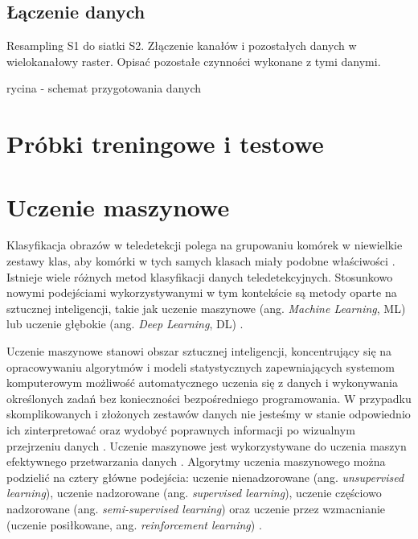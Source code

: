 \documentclass{amuthesis}
\begin{document}
\hypertarget{sec-processing-data-merging}{%
\subsection{Łączenie danych}\label{sec-processing-data-merging}}

Resampling S1 do siatki S2. Złączenie kanałów i pozostałych danych w
wielokanałowy raster. Opisać pozostałe czynności wykonane z tymi danymi.

rycina - schemat przygotowania danych

\hypertarget{sec-samples-methods}{%
\section{Próbki treningowe i testowe}\label{sec-samples-methods}}

\hypertarget{sec-machine-learning}{%
\section{Uczenie maszynowe}\label{sec-machine-learning}}

Klasyfikacja obrazów w teledetekcji polega na grupowaniu komórek w
niewielkie zestawy klas, aby komórki w tych samych klasach miały podobne
właściwości \autocite{ismail_2009_classification}. Istnieje wiele
różnych metod klasyfikacji danych teledetekcyjnych. Stosunkowo nowymi
podejściami wykorzystywanymi w tym kontekście są metody oparte na
sztucznej inteligencji, takie jak uczenie maszynowe (ang. \emph{Machine
Learning}, ML) lub uczenie głębokie (ang. \emph{Deep Learning}, DL)
\autocite{hejmanowska_2020_dane}.

Uczenie maszynowe stanowi obszar sztucznej inteligencji, koncentrujący
się na opracowywaniu algorytmów i modeli statystycznych zapewniających
systemom komputerowym możliwość automatycznego uczenia się z danych i
wykonywania określonych zadań bez konieczności bezpośredniego
programowania. W przypadku skomplikowanych i złożonych zestawów danych
nie jesteśmy w stanie odpowiednio ich zinterpretować oraz wydobyć
poprawnych informacji po wizualnym przejrzeniu danych
\autocite{mahesh_2019_ml}. Uczenie maszynowe jest wykorzystywane do
uczenia maszyn efektywnego przetwarzania danych
\autocite{sindayigaya_2022_ml}. Algorytmy uczenia maszynowego można
podzielić na cztery główne podejścia: uczenie nienadzorowane (ang.
\emph{unsupervised learning}), uczenie nadzorowane (ang.
\emph{supervised learning}), uczenie częściowo nadzorowane (ang.
\emph{semi-supervised learning}) oraz uczenie przez wzmacnianie (uczenie
posiłkowane, ang. \emph{reinforcement learning})
\autocite{sarker_2021_ml}.
\end{document}
